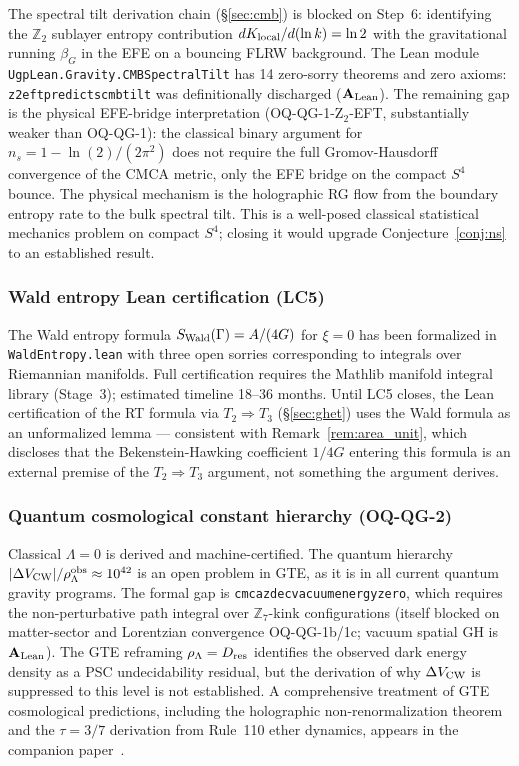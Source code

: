 \documentclass[11pt]{article}
\theoremstyle{remark}
\newcommand{\ZS}{\mathbb{Z}_7}
\newcommand{\lean}[1]{%
  \penalty-100
  \begingroup\def\_{\textunderscore\allowbreak}\texttt{#1}\endgroup}
\newcommand{\Dres}{D_{\rm res}}
\newcommand{\CatAL}{\ensuremath{\textbf{A}_{\rm Lean}}}
\begin{document}
The spectral tilt derivation chain (\S\ref{sec:cmb}) is blocked on Step~6: identifying
the $\mathbb{Z}_2$ sublayer entropy contribution $dK_{\rm local}/d(\ln k) = \ln 2$
with the gravitational running $\beta_G$ in the EFE on a bouncing FLRW background.
The Lean module \lean{UgpLean.Gravity.CMBSpectralTilt} has 14 zero-sorry theorems and
zero axioms: \lean{z2\_eft\_predicts\_cmb\_tilt} was definitionally discharged ($\CatAL$).
The remaining gap is the physical EFE-bridge interpretation (OQ-QG-1-Z$_2$-EFT,
substantially weaker than OQ-QG-1): the classical binary argument for
$n_s = 1 - \ln(2)/(2\pi^2)$ does not require the full Gromov-Hausdorff convergence
of the CMCA metric, only the EFE bridge on the compact $S^4$ bounce.
The physical mechanism is the holographic RG flow from the boundary entropy rate to the
bulk spectral tilt.  This is a well-posed classical statistical mechanics problem
on compact $S^4$; closing it would upgrade Conjecture~\ref{conj:ns} to an
established result.

\subsubsection{Wald entropy Lean certification (LC5)}

The Wald entropy formula $S_{\rm Wald}(\Gamma) = A/(4G)$ for $\xi=0$ has been
formalized in \lean{WaldEntropy.lean} with three open sorries corresponding to
integrals over Riemannian manifolds.  Full certification requires the Mathlib manifold
integral library (Stage~3); estimated timeline 18--36 months.  Until LC5 closes, the
Lean certification of the RT formula via $T_2\Rightarrow T_3$ (\S\ref{sec:ghet}) uses
the Wald formula as an unformalized lemma --- consistent with Remark~\ref{rem:area_unit},
which discloses that the Bekenstein-Hawking coefficient $1/4G$ entering this formula is
an external premise of the $T_2\Rightarrow T_3$ argument, not something the argument
derives.

\subsubsection{Quantum cosmological constant hierarchy (OQ-QG-2)}

Classical $\Lambda = 0$ is derived and machine-certified.  The quantum hierarchy
$|\Delta V_{\rm CW}|/\rho_\Lambda^{\rm obs}\approx 10^{42}$ is an open problem in
GTE, as it is in all current quantum gravity programs.  The formal gap is
\lean{cmca\_zdec\_vacuum\_energy\_zero}, which requires the non-perturbative path
integral over $\ZS$-kink configurations (itself blocked on matter-sector and Lorentzian
convergence OQ-QG-1b/1c; vacuum spatial GH is \CatAL).  The GTE
reframing $\rho_\Lambda = \Dres$ identifies the observed dark energy density as a
PSC undecidability residual, but the derivation of why $\Delta V_{\rm CW}$ is
suppressed to this level is not established.
A comprehensive treatment of GTE cosmological predictions, including the holographic non-renormalization theorem and the $\tau=3/7$ derivation from Rule~110 ether dynamics, appears in the companion paper~\cite{SpivackGTECosmology}.
\end{document}
